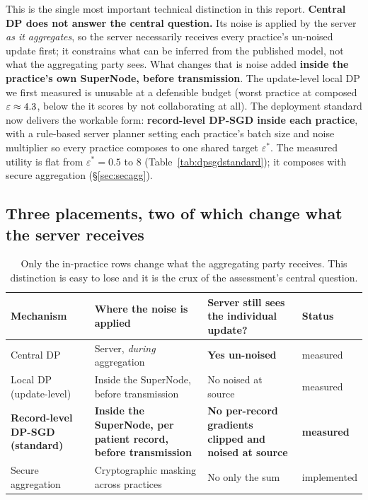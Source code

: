 \label{sec:noise}
\statusMeasured

\begin{shortanswer}
This is the single most important technical distinction in this report. \textbf{Central DP does not
answer the central question.} Its noise is applied by the server \emph{as it aggregates}, so the
server necessarily receives every practice's un-noised update first; it constrains what can be
inferred from the published model, not what the aggregating party sees. What changes that is noise
added \textbf{inside the practice's own SuperNode, before transmission}. The update-level local DP
we first measured is unusable at a defensible budget (worst practice \LocalWorstOne{} at composed
$\varepsilon \approx 4.3{}$, below the \LocalWorst{} it scores by not collaborating at
all). The deployment standard now delivers the workable form: \textbf{record-level DP-SGD inside
each practice}, with a rule-based server planner setting each practice's batch size and noise
multiplier so every practice composes to one shared target $\varepsilon^{*}$. The measured utility
is flat from $\varepsilon^{*} = 0.5$ to $8$ (Table~\ref{tab:dpsgdstandard}); it composes with
secure aggregation (\S\ref{sec:secagg}).
\end{shortanswer}

\subsection{Three placements, two of which change what the server receives}

\begin{table}[htbp]
  \centering
  \small
  \begin{tabular}{lp{4.0cm}p{3.4cm}l}
    \toprule
    Mechanism & Where the noise is applied & Server still sees the individual update? & Status \\
    \midrule
    Central DP & Server, \emph{during} aggregation & \textbf{Yes un-noised} & measured \\
    Local DP (update-level) & Inside the SuperNode, before transmission & No noised at source & measured \\
    \textbf{Record-level DP-SGD (standard)} & \textbf{Inside the SuperNode, per patient record, before transmission} & \textbf{No per-record gradients clipped and noised at source} & \textbf{measured} \\
    Secure aggregation & Cryptographic masking across practices & No only the sum & implemented \\
    \bottomrule
  \end{tabular}
  \caption{Only the in-practice rows change what the aggregating party receives. This distinction is
  easy to lose and it is the crux of the assessment's central question.}
  \label{tab:placements}
\end{table}

